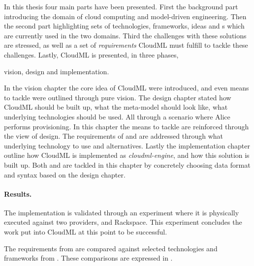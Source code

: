 
In this thesis four main parts have been presented.
First the background part introducing the domain of cloud computing and model-driven engineering.
Then the second part highlighting sets of technologies, frameworks, ideas and 
s which are currently used in the two domains.
Third the challenges with these solutions are stressed, as well as a set of \emph{requirements}
CloudML must fulfill to tackle these challenges.
Lastly, CloudML is presented, in three phases,
\begin{ii}
  \iitem vision,
  \iitem design and
  \iitem implementation.
\end{ii}

In the vision chapter the core idea of CloudML were introduced,
and even means to tackle  were outlined through pure vision.
The design chapter stated how CloudML should be built up,
what the meta-model should look like,
what underlying technologies should be used.
All through a scenario where Alice performs provisioning.
In this chapter the means to tackle  are reinforced through
the view of design.
The requirements of  and 
are addressed through what underlying technology to use and alternatives.
Lastly the implementation chapter outline how CloudML is implemented
as \emph{cloudml-engine}, and how this solution is built up.
Both  and  are tackled in this chapter
by concretely choosing data format and syntax based on the design chapter.

\paragraph{Results.}

The implementation is validated through an experiment where
it is physically executed against two providers,  and Rackspace.
This experiment concludes the work put into CloudML at this point to be successful.

The requirements from  are compared against selected
technologies and frameworks from .
These comparisons are expressed in .


